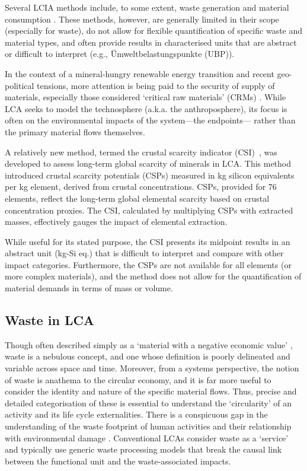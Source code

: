 Several LCIA methods include, to some extent, waste generation \citep{foen2021ecofactors,hauschild2003edip,cen2019en15804} and material consumption \citep{arvidsson2020csi,foen2021ecofactors}. These methods, however, are generally limited in their scope (especially for waste), do not allow for flexible quantification of specific waste and material types, and often provide results in characterised units that are abstract or difficult to interpret (e.g., Ümweltbelastungspunkte (UBP)).


In the context of a mineral-hungry renewable energy transition and recent geo-political tensions, more attention is being paid to the security of supply of materials, especially those considered `critical raw materials' (CRMs) \citep{eu2023crmstudy,hool2023crm,mancini2013supplysecurity,jrc2023supplychain,hartley2024cepolitics,salviulo2021supplychain}. While LCA seeks to model the technosphere (a.k.a. the anthroposphere), its focus is often on the environmental impacts of the system---the endpoints--- rather than the primary material flows themselves. 

A relatively new method, termed the crustal scarcity indicator (CSI)~\citep{arvidsson2020csi}, was developed to assess long-term global scarcity of minerals in LCA. This method introduced crustal scarcity potentials (CSPs) measured in kg silicon equivalents per kg element, derived from crustal concentrations. CSPs, provided for 76 elements, reflect the long-term global elemental scarcity based on crustal concentration proxies. The CSI, calculated by multiplying CSPs with extracted masses, effectively gauges the impact of elemental extraction. 

While useful for its stated purpose, the CSI presents its midpoint results in an abstract unit (kg-Si eq.) that is difficult to interpret and compare with other impact categories. Furthermore, the CSPs are not available for all elements (or more complex materials), and the method does not allow for the quantification of material demands in terms of mass or volume.


\subsection{Waste in LCA}

Though often described simply as a `material with a negative economic value' \citep{guinee2004economicallocation}, waste is a nebulous concept, and one whose definition is poorly delineated and variable across space and time.  Moreover, from a systems perspective, the notion of waste is anathema to the circular economy, and it is far more useful to consider the identity and nature of the specific material flows. Thus, precise and detailed categorisation of these is essential to understand the `circularity' of an activity and its life cycle externalities. There is a conspicuous gap in the understanding of the waste footprint of human activities and their relationship with environmental damage \citep{laurenti2023wastefootprint}. Conventional LCAs consider waste as a `service' \citep{guinee2021wasteisnotaservice} and typically use generic waste processing models \citep{beylot2018} that break the causal link between the functional unit and the waste-associated impacts.

